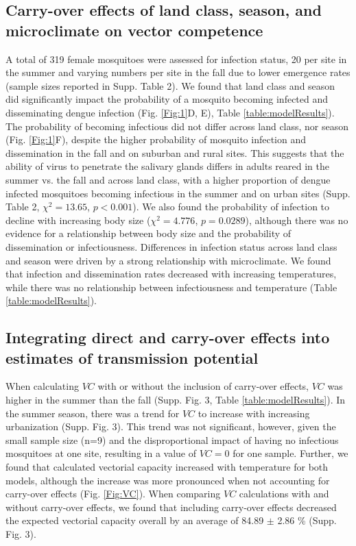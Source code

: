 \documentclass[12pt]{article}
\begin{document}
\subsection{Carry-over effects of land class, season, and microclimate on vector competence}

A total of 319 female mosquitoes were assessed for infection status, 20 per site in the summer and varying numbers per site in the fall due to lower emergence rates (sample sizes reported in Supp. Table 2). We found that land class and season did significantly impact the probability of a mosquito becoming infected and disseminating dengue infection (Fig. \ref{Fig:1}D, E), Table \ref{table:modelResults}). The probability of becoming infectious did not differ across land class, nor season (Fig. \ref{Fig:1}F), despite the higher probability of mosquito infection and dissemination in the fall and on suburban and rural sites. This suggests that the ability of virus to penetrate the salivary glands differs in adults reared in the summer vs. the fall and across land class, with a higher proportion of dengue infected mosquitoes becoming infectious in the summer and on urban sites (Supp. Table 2, $\chi^2=13.65$, $p<0.001$). We also found the probability of infection to decline with increasing body size ($\chi^2=4.776$, $p=0.0289$), although there was no evidence for a relationship between body size and the probability of dissemination or infectiousness. Differences in infection status across land class and season were driven by a strong relationship with microclimate. We found that infection and dissemination rates decreased with increasing temperatures, while there was no relationship between infectiousness and temperature (Table \ref{table:modelResults}).

\subsection{Integrating direct and carry-over effects into estimates of transmission potential}

When calculating $VC$ with or without the inclusion of carry-over effects, $VC$ was higher in the summer than the fall (Supp. Fig. 3, Table \ref{table:modelResults}). In the summer season, there was a trend for $VC$ to increase with increasing urbanization (Supp. Fig. 3). This trend was not significant, however, given the small sample size (n=9) and the disproportional impact of having no infectious mosquitoes at one site, resulting in a value of $VC=0$ for one sample. Further, we found that calculated vectorial capacity increased with temperature for both models, although the increase was more pronounced when not accounting for carry-over effects (Fig. \ref{Fig:VC}). When comparing $VC$ calculations with and without carry-over effects, we found that including carry-over effects decreased the expected vectorial capacity overall by an average of 84.89 $\pm$ 2.86 \% (Supp. Fig. 3).
\end{document}
